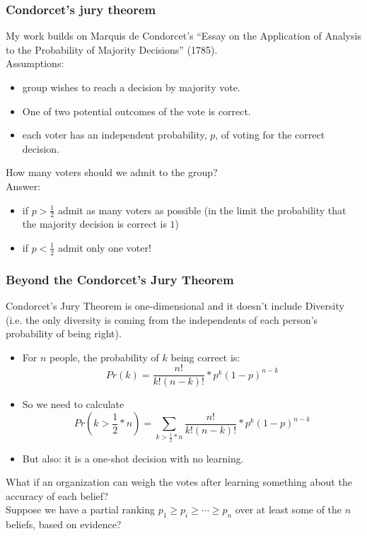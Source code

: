\documentclass{beamer}
\begin{document}
\begin{frame}
\frametitle{Condorcet's jury theorem}
My work builds on Marquis de Condorcet's ``Essay on the Application of Analysis to the Probability of Majority Decisions'' (1785).\\
Assumptions:
\begin{itemize}
\item group wishes to reach a decision by majority vote.
\item One of two potential outcomes of the vote is correct.
\item each voter has an independent probability, $p$, of voting for the correct decision.
\end{itemize}
How many voters should we admit to the group?\\
Answer:
\begin{itemize}
\item if $p> \frac{1}{2}$ admit as many voters as possible (in the limit the probability that the majority decision is correct is $1$)
\item if $p<\frac{1}{2}$ admit only one voter!
\end{itemize}
\end{frame}
\begin{frame}
\frametitle{Beyond the Condorcet's Jury Theorem}
Condorcet's Jury Theorem is one-dimensional and it doesn't include Diversity (i.e. the only diversity is coming from the independents of each person's probability of being right).\\
\begin{itemize}
\item For $n$ people, the probability of $k$ being correct is:
$$Pr(k)=\frac{n!}{k!(n-k)!} * p^k(1-p)^{n-k}$$
\item So we need to calculate
$$Pr(k>\frac{1}{2}*n)=\sum_{k>\frac{1}{2}*n}\frac{n!}{k!(n-k)!} * p^k(1-p)^{n-k}$$
\item But also: it is a one-shot decision with no learning.\\
\end{itemize}
What if an organization can weigh the votes after learning something about the accuracy of each belief?\\
Suppose we have a partial ranking $p_1 \geq p_i \geq \cdots\geq p_n$ over at least some of the $n$ beliefs, based on evidence?
\end{frame}
\end{document}
